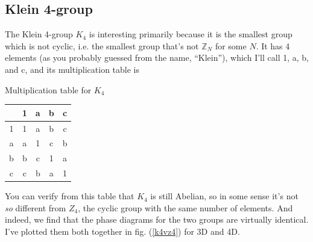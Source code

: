 \documentclass[9pt,twocolumn,twoside]{article}
\begin{document}
\newpage

\subsection{Klein 4-group}
The Klein 4-group $K_4$ is interesting primarily because it is the smallest group which is not cyclic, i.e. the smallest group that's not $\mathbb{Z}_N$ for some $N$.  It has 4 elements (as you probably guessed from the name, ``Klein''), which I'll call 1, a, b, and c, and its multiplication table is

\begin{table}[h!]
\centering
Multiplication table for $K_4$

\begin{tabular} {c | c c c c }
& 1 & a & b & c \\
\hline
1 & 1 & a & b & c \\
a & a & 1 & c & b \\
b & b & c & 1 & a \\
c & c & b & a & 1 \\
\end{tabular}
\end{table}

You can verify from this table that $K_4$ is still Abelian, so in some sense it's not \textit{so} different from $Z_4$, the cyclic group with the same number of elements.  And indeed, we find that the phase diagrams for the two groups are virtually identical.  I've plotted them both together in fig. (\ref{k4vz4}) for 3D and 4D.
\end{document}
